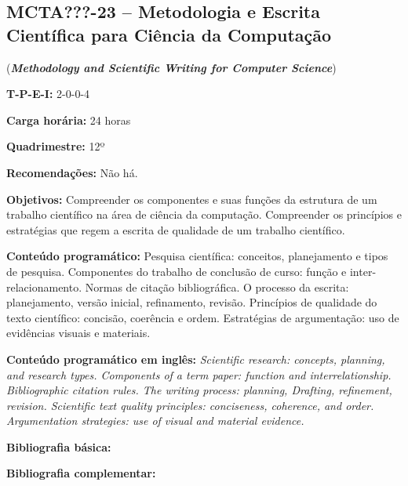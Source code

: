 \documentclass[12pt,a4paper]{article}
\begin{document}
\subsection*{MCTA???-23 -- Metodologia e Escrita Científica para Ciência da Computação}
\label{disc:metod}

(\textbf{\textit{Methodology and Scientific Writing for Computer Science}})

\begin{center}
\begin{minipage}{0.85\textwidth}

    \textbf{T-P-E-I:} 2-0-0-4

    \textbf{Carga horária:} 24 horas
    
    \textbf{Quadrimestre:} 12º
    
    \textbf{Recomendações:} Não há.
    
\end{minipage}
\end{center}

\textbf{Objetivos:}
Compreender os componentes e suas funções da estrutura de um trabalho
científico na área de ciência da computação. 
Compreender os princípios e estratégias que regem a escrita de qualidade de um
trabalho científico.

\textbf{Conteúdo programático:}
Pesquisa científica: conceitos, planejamento e tipos de pesquisa. 
Componentes do trabalho de conclusão de curso: função e inter-relacionamento. 
Normas de citação bibliográfica. 
O processo da escrita: planejamento, versão inicial, refinamento, revisão. 
Princípios de qualidade do texto científico: concisão, coerência e ordem. 
Estratégias de argumentação: uso de evidências visuais e materiais.

\textbf{Conteúdo programático em inglês:}
\textit{Scientific research: concepts, planning, and research types.
Components of a term paper: function and interrelationship.
Bibliographic citation rules.
The writing process: planning, Drafting, refinement, revision.
Scientific text quality principles: conciseness, coherence, and order.
Argumentation strategies: use of visual and material evidence.}

\newrefsection
\textbf{Bibliografia básica:}
\nocite{2007-cervo-bervian, 2010-creswell-creswell, 2010-salomon} 
\printbibliography

\newrefsection
\textbf{Bibliografia complementar:}
\nocite{2015-junior, 2014-wazlawick, 2019-medeiros, 2016-wayne, 2001-rubens}

\printbibliography
\end{document}
